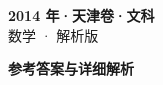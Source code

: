 \documentclass[zihao=-4, a4paper]{ctexart}
\begin{document}
\begin{center}
  {\Large\bfseries 2014 年·天津卷·文科}\\[4pt]
  {\large 数学 · 解析版}
\end{center}
\medskip
{}

\clearpage
{}
\begin{center}{\Large\bfseries 参考答案与详细解析}\end{center}
\medskip

\end{document}
